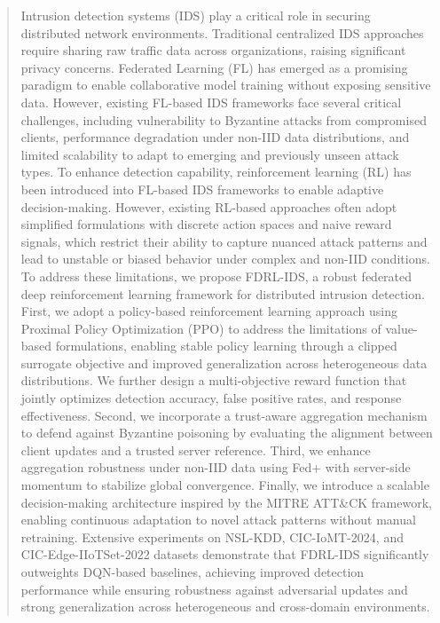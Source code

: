 \documentclass[conference]{IEEEtran}
\begin{document}
\begin{abstract}

Intrusion detection systems (IDS) play a critical role in securing distributed network environments. Traditional centralized IDS approaches require sharing raw traffic data across organizations, raising significant privacy concerns. Federated Learning (FL) has emerged as a promising paradigm to enable collaborative model training without exposing sensitive data. However, existing FL-based IDS frameworks face several critical challenges, including vulnerability to Byzantine attacks from compromised clients, performance degradation under non-IID data distributions, and limited scalability to adapt to emerging and previously unseen attack types.
To enhance detection capability, reinforcement learning (RL) has been introduced into FL-based IDS frameworks to enable adaptive decision-making. However, existing RL-based approaches often adopt simplified formulations with discrete action spaces and naive reward signals, which restrict their ability to capture nuanced attack patterns and lead to unstable or biased behavior under complex and non-IID conditions. 
To address these limitations, we propose FDRL-IDS, a robust federated deep reinforcement learning framework for distributed intrusion detection. First, we adopt a policy-based reinforcement learning approach using Proximal Policy Optimization (PPO) to address the limitations of value-based formulations, enabling stable policy learning through a clipped surrogate objective and improved generalization across heterogeneous data distributions. We further design a multi-objective reward function that jointly optimizes detection accuracy, false positive rates, and response effectiveness. Second, we incorporate a trust-aware aggregation mechanism  to defend against Byzantine poisoning by evaluating the alignment between client updates and a trusted server reference. Third, we enhance aggregation robustness under non-IID data using Fed+ with server-side momentum to stabilize global convergence. Finally, we introduce a scalable decision-making architecture inspired by the MITRE ATT\&CK framework, enabling continuous adaptation to novel attack patterns without manual retraining.
Extensive experiments on NSL-KDD, CIC-IoMT-2024, and CIC-Edge-IIoTSet-2022 datasets demonstrate that FDRL-IDS significantly outweights DQN-based baselines, achieving improved detection performance while ensuring robustness against adversarial updates and strong generalization across heterogeneous and cross-domain environments.



\end{abstract}
\end{document}
